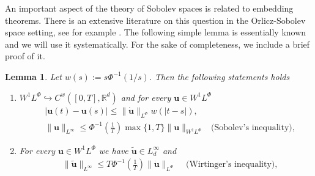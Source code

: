 \documentclass[twoside]{article}
\newtheorem{lem}[thm]{Lemma}
\theoremstyle{remark}
\newcommand{\orlnor}{\|_{L^{\Phi}}}
\newcommand{\lphi}{L^{\Phi}}
\newcommand{\wphi}{W^{1}\lphi}
\newcommand{\sobnor}{\|_{W^{1}\lphi}}
\renewcommand{\b}[1]{\boldsymbol{#1}}
\newcommand{\rr}{\mathbb{R}}
\renewcommand{\leq}{\leqslant}
\begin{document}
 An important aspect of the theory of Sobolev spaces is related to embedding theorems. There is an extensive literature on this question in the  Orlicz-Sobolev space setting, see for example
 \cite{cianchi2000fully,cianchi1999some,claverooptimal,edmunds2000optimal,kerman2006optimal}.
The following simple lemma is essentially known and we will use it systematically. For the sake of completeness, we include a brief proof of it.



\begin{lem}\label{inclusion orlicz} Let  $w(s):= s\Phi^{-1}(1/s)$. Then the following statements holds
\begin{enumerate}
\item\label{inclusion orlicz_item1} $\wphi\hookrightarrow C^w([0,T],\rr^d) $ and for every $\b{u}\in\wphi$
\begin{align}
 &\left|\b{u}(t)-\b{u}(s) \right| \leq  \|\b{\dot{u}}\orlnor w(| t-s|),&\label{in-sob-cont}
\\
& \|\b{u}\|_{L^{\infty}} \leq\Phi^{-1}\left(\frac{1}{T}\right)\max\{1,T\}\|\b{u}\sobnor&\text{(Sobolev's inequality),}\label{sobolev}
\end{align}
\item For every $\b{u}\in\wphi$ we have $\widetilde{\b{u}}\in L^{\infty}_d$ and 
\begin{align}
& \|\widetilde{\b{u}}\|_{L^{\infty}} \leq T\Phi^{-1}\left(\frac{1}{T}\right)\|\b{\dot u}\orlnor&\text{  (Wirtinger's inequality),}\label{wirtinger}
\end{align}




\end{enumerate}
\end{lem}
\end{document}
